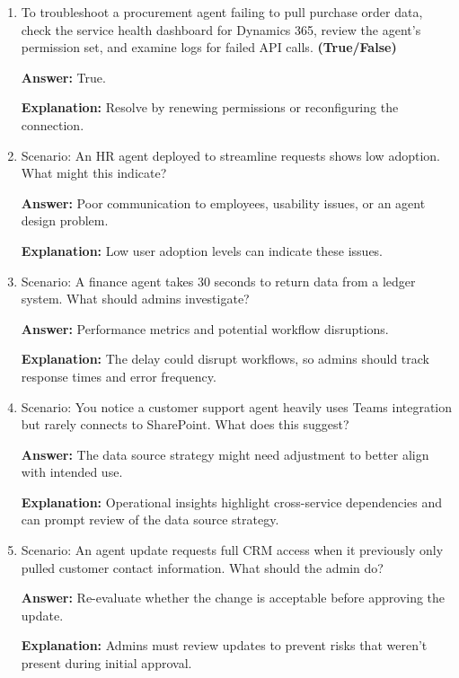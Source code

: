 \documentclass[10pt]{article}
\begin{document}
\begin{enumerate}[leftmargin=*]
\textbf{Answer:} True.

\textbf{Explanation:} Connectivity problems may occur if an agent loses connection to a backend service. Permission errors arise from insufficient permissions. Performance degradation can result from high load or dependency bottlenecks.

\item To troubleshoot a procurement agent failing to pull purchase order data, check the service health dashboard for Dynamics 365, review the agent’s permission set, and examine logs for failed API calls. \textbf{(True/False)}

\textbf{Answer:} True.

\textbf{Explanation:} Resolve by renewing permissions or reconfiguring the connection.

\item Scenario: An HR agent deployed to streamline requests shows low adoption. What might this indicate?

\textbf{Answer:} Poor communication to employees, usability issues, or an agent design problem.

\textbf{Explanation:} Low user adoption levels can indicate these issues.

\item Scenario: A finance agent takes 30 seconds to return data from a ledger system. What should admins investigate?

\textbf{Answer:} Performance metrics and potential workflow disruptions.

\textbf{Explanation:} The delay could disrupt workflows, so admins should track response times and error frequency.

\item Scenario: You notice a customer support agent heavily uses Teams integration but rarely connects to SharePoint. What does this suggest?

\textbf{Answer:} The data source strategy might need adjustment to better align with intended use.

\textbf{Explanation:} Operational insights highlight cross-service dependencies and can prompt review of the data source strategy.

\item Scenario: An agent update requests full CRM access when it previously only pulled customer contact information. What should the admin do?

\textbf{Answer:} Re-evaluate whether the change is acceptable before approving the update.

\textbf{Explanation:} Admins must review updates to prevent risks that weren’t present during initial approval.

\end{enumerate}

\clearpage
\end{document}
